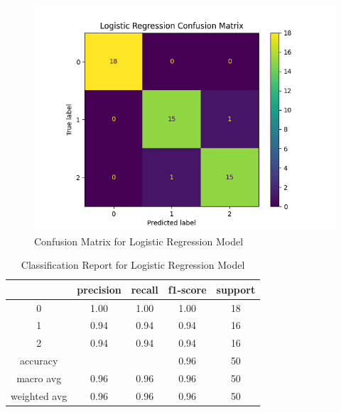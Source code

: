 \documentclass[journal]{IEEEtran}
\begin{document}
\begin{figure}[h!]
\includegraphics[scale=.5]{logR_cm.png}
\centering
\caption{Confusion Matrix for Logistic Regression Model}
\label{fig:cm-logreg}
\end{figure}

\begin{table}[h!]
\centering
\begin{tabular}{ c | c c c c }
& precision   & recall & f1-score  & support \\
\hline
0   &    1.00   &   1.00   &   1.00   &     18\\
1   &    0.94   &   0.94   &   0.94   &     16\\
2   &    0.94   &   0.94   &   0.94   &     16\\
\hline
    accuracy   &           &         &    0.96    &    50\\
   macro avg   &    0.96   &   0.96  &    0.96    &    50\\
weighted avg   &    0.96   &   0.96  &    0.96    &    50\\
\end{tabular}
\caption{Classification Report for Logistic Regression Model}
\label{table:classReport-logreg}
\end{table}
\end{document}
